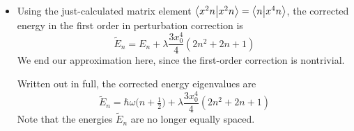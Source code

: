 \documentclass[11pt, a4paper]{article}
\renewcommand{\t}[1]{\tilde{#1}}
\begin{document}
\begin{itemize}
	\item Using the just-calculated matrix element $ \braket{x^{2}n}{x^{2}n} = \braket{n}{x^{4}n} $, the corrected energy in the first order in perturbation correction is
	\begin{equation*}
		\t{E}_{n} = E_{n} + \lambda \frac{3x_{0}^{4}}{4}(2n^{2} + 2n + 1)
	\end{equation*}
	We end our approximation here, since the first-order correction is nontrivial.
	
	Written out in full, the corrected energy eigenvalues are
	\begin{equation*}
		\t{E}_{n} = \hbar \omega\big(n + \tfrac{1}{2}\big) + \lambda \frac{3x_{0}^{4}}{4}(2n^{2} + 2n + 1)
	\end{equation*}
	Note that the energies $ \t{E}_{n} $ are no longer equally spaced.
\end{itemize}
\end{document}
